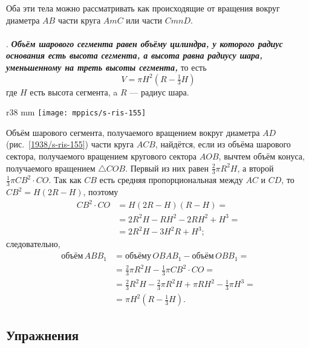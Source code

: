 Оба эти тела можно рассматривать как происходящие от вращения вокруг диаметра $AB$ части круга $AmC$ или части $CmnD$.

\paragraph{}\label{1938/s149}
.
\textbf{\emph{Объём шарового сегмента равен объёму цилиндра, у которого радиус основания есть высота сегмента, а высота равна радиусу шара, уменьшенному на треть высоты сегмента,}} то есть
\[ V = \pi H^2(R-\tfrac13 H)\]
где $H$ есть высота сегмента, a $R$ — радиус шара.


\begin{wrapfigure}{r}{38 mm}
\vskip-0mm
\centering
\texttt{[image: mppics/s-ris-155]}
\caption{}\label{1938/s-ris-155}
\vskip-0mm
\end{wrapfigure}

Объём шарового сегмента, получаемого вращением вокруг диаметра $AD$ (рис.~\ref{1938/s-ris-155}) части круга $ACB$, найдётся, если из объёма шарового сектора, получаемого вращением кругового сектора $AOB$, вычтем объём конуса, получаемого вращением $\triangle COB$.
Первый из них равен $\tfrac23\pi R^2H$, а второй $\tfrac13\pi CB^2\cdot CO$.
Так как $CB$ есть средняя пропорциональная между $AC$ и $CD$, то $CB^2 = H(2R - H)$, поэтому
\begin{align*}
CB^2\cdot CO &= H(2R - H)(R - H)=
\\
&=2R^2H - RH^2 - 2RH^2 + H^3 =
\\
&= 2R^2H-3H^2R + H^3;
\end{align*}
следовательно, 
\begin{align*}
\text{объём}\, ABB_1
&= \text{объёму}\, OBAB_1- \text{объём}\, OBB_1=
\\
&=\tfrac23\pi R^2H -\tfrac13 \pi CB^2\cdot CO = 
\\
&=\tfrac23 R^2H - \tfrac23\pi R^2H + \pi RH^2 - \tfrac13\pi H^3 = 
\\
&= \pi H^2(R-\tfrac13H).
\end{align*}

\subsection*{Упражнения}

